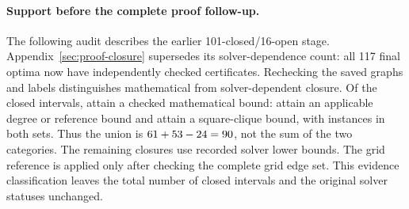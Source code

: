 \paragraph{Support before the complete proof follow-up.}
The following audit describes the earlier 101-closed/16-open stage.
Appendix~\ref{sec:proof-closure} supersedes its solver-dependence count:
all 117 final optima now have independently checked certificates.
Rechecking the saved graphs and labels distinguishes mathematical from
solver-dependent closure. Of the \SupportClosed{} closed intervals,
\SupportIndependent{} attain a checked mathematical bound:
\SupportTheory{} attain an applicable degree or reference bound and
\SupportClique{} attain a square-clique bound, with \SupportOverlap{}
instances in both sets. Thus the union is
$61+53-24=90$,
not the sum of the two categories. The remaining
\SupportSolverDependent{} closures use recorded solver lower bounds.
The grid reference is applied only after checking the complete grid
edge set. This evidence classification leaves the total number of
closed intervals and the original solver statuses unchanged.

